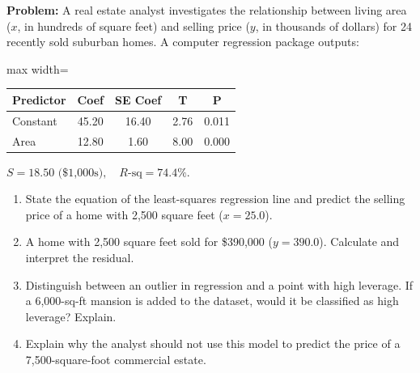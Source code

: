 \begin{frqrubricbox}
\textbf{Problem:} A real estate analyst investigates the relationship between living area ($x$, in hundreds of square feet) and selling price ($y$, in thousands of dollars) for 24 recently sold suburban homes. A computer regression package outputs:
\begin{center}
\begin{adjustbox}{max width=\linewidth}
\begin{tabular}{lcccc}
\toprule
\textbf{Predictor} & \textbf{Coef} & \textbf{SE Coef} & \textbf{T} & \textbf{P} \\
\midrule
Constant & 45.20 & 16.40 & 2.76 & 0.011 \\
Area & 12.80 & 1.60 & 8.00 & 0.000 \\
\bottomrule
\end{tabular}
\end{adjustbox}
\end{center}
$S = 18.50\text{ (\$1,000s)}, \quad R\text{-sq} = 74.4\%$.
\begin{enumerate}[label=(\alph*)]
  \item State the equation of the least-squares regression line and predict the selling price of a home with 2,500 square feet ($x = 25.0$).
  \item A home with 2,500 square feet sold for \$390,000 ($y = 390.0$). Calculate and interpret the residual.
  \item Distinguish between an outlier in regression and a point with high leverage. If a 6,000-sq-ft mansion is added to the dataset, would it be classified as high leverage? Explain.
  \item Explain why the analyst should not use this model to predict the price of a 7,500-square-foot commercial estate.
\end{enumerate}


\end{frqrubricbox}
